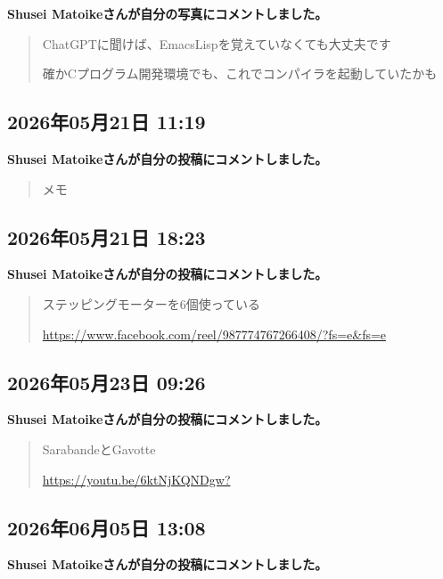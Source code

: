 \textbf{Shusei Matoikeさんが自分の写真にコメントしました。}

\begin{quote}
ChatGPTに聞けば、EmacsLispを覚えていなくても大丈夫です

確かCプログラム開発環境でも、これでコンパイラを起動していたかも
\end{quote}

\subsection*{2026年05月21日 11:19}

\textbf{Shusei Matoikeさんが自分の投稿にコメントしました。}

\begin{quote}
メモ
\end{quote}

\subsection*{2026年05月21日 18:23}

\textbf{Shusei Matoikeさんが自分の投稿にコメントしました。}

\begin{quote}
ステッピングモーターを6個使っている

\url{https://www.facebook.com/reel/987774767266408/?fs=e&fs=e}
\end{quote}

\subsection*{2026年05月23日 09:26}

\textbf{Shusei Matoikeさんが自分の投稿にコメントしました。}

\begin{quote}
SarabandeとGavotte

\url{https://youtu.be/6ktNjKQNDgw?}
\end{quote}

\subsection*{2026年06月05日 13:08}

\textbf{Shusei Matoikeさんが自分の投稿にコメントしました。}

